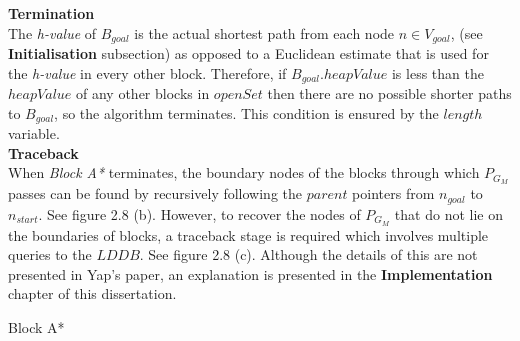 \documentclass[12pt,notitlepage]{report}
\begin{document}
\noindent
{\bfseries Termination}\\
\noindent
The {\em h-value} of $B_{goal}$ is the actual shortest path from each node $n \in V_{goal}$, (see {\bfseries Initialisation} subsection) as opposed to a Euclidean estimate that is used for the {\em h-value} in every other block. Therefore, if $B_{goal}.heapValue$ is less than the $heapValue$ of any other blocks in $openSet$ then there are no possible shorter paths to $B_{goal}$, so the algorithm terminates. This condition is ensured by the $length$ variable.\\

\noindent
{\bfseries Traceback}\\
\noindent
When {\em Block A*} terminates, the boundary nodes of the blocks through which $P_{G_{M}}$ passes can be found by recursively following the $parent$ pointers from $n_{goal}$ to $n_{start}$. See figure 2.8 (b). However, to recover the nodes of $P_{G_{M}}$ that do not lie on the boundaries of blocks, a traceback stage is required which involves multiple queries to the $LDDB$. See figure 2.8 (c). Although the details of this are not presented in Yap's paper, an explanation is presented in the {\bfseries Implementation} chapter of this dissertation.\\

\begin{algorithm}
  \SetAlgoLined\DontPrintSemicolon

 \setcounter{AlgoLine}{0}
 
  \caption{{\sc Block A*}}
\end{algorithm} 
\end{document}
